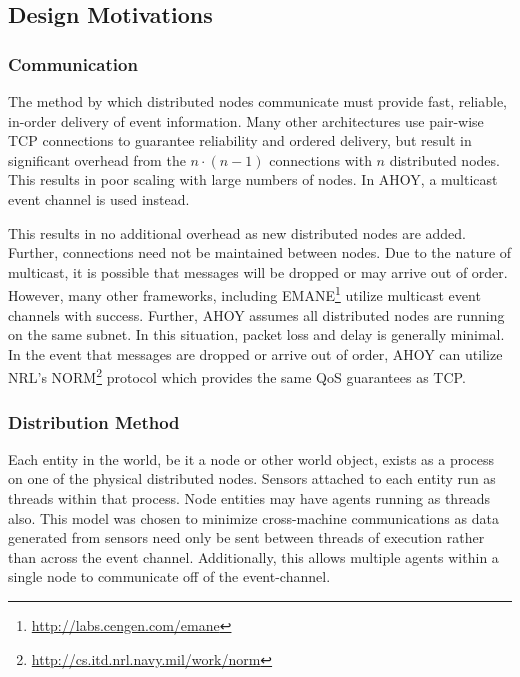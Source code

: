 \documentclass[titlepage]{article}
\begin{document}
\subsection{Design Motivations}
\subsubsection{Communication}
The method by which distributed nodes communicate must provide fast, reliable, in-order delivery of event information.  Many other architectures use pair-wise TCP connections to guarantee reliability and ordered delivery, but result in significant overhead from the $n \cdot (n-1)$ connections with $n$ distributed nodes.  This results in poor scaling with large numbers of nodes.  In AHOY, a multicast event channel is used instead.

This results in no additional overhead as new distributed nodes are added.  Further, connections need not be maintained between nodes.  Due to the nature of multicast, it is possible that messages will be dropped or may arrive out of order.  However, many other frameworks, including EMANE\footnote{\url{http://labs.cengen.com/emane}} utilize multicast event channels with success.  Further, AHOY assumes all distributed nodes are running on the same subnet. In this situation, packet loss and delay is generally minimal.  In the event that messages are dropped or arrive out of order, AHOY can utilize NRL's NORM\footnote{\url{http://cs.itd.nrl.navy.mil/work/norm}} protocol which provides the same QoS guarantees as TCP.

\subsubsection{Distribution Method}
Each entity in the world, be it a node or other world object, exists as a process on one of the physical distributed nodes.  Sensors attached to each entity run as threads within that process.  Node entities may have agents running as threads also.  This model was chosen to minimize cross-machine communications as data generated from sensors need only be sent between threads of execution rather than across the event channel.  Additionally, this allows multiple agents within a single node to communicate off of the event-channel.
\end{document}
